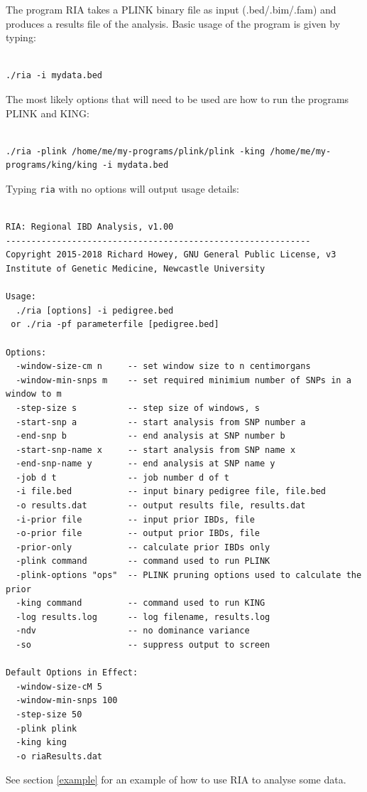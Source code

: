\documentclass[a4paper,12pt]{article}
\newcommand{\code}[1]{{\footnotesize{{\tt #1}}}}
\begin{document}
The program RIA takes a PLINK binary file as input (.bed/.bim/.fam) and produces a results file of the analysis. Basic usage of the program is given by typing: 
\vspace{0.35cm} \begin{lstlisting}

./ria -i mydata.bed

\end{lstlisting} \vspace{0.35cm}
The most likely options that will need to be used are how to run the programs PLINK and KING: 
\vspace{0.35cm} \begin{lstlisting}

./ria -plink /home/me/my-programs/plink/plink -king /home/me/my-programs/king/king -i mydata.bed

\end{lstlisting} \vspace{0.35cm}
Typing \code{ria} with no options will output usage details: 
\vspace{0.35cm} \begin{lstlisting}

RIA: Regional IBD Analysis, v1.00
------------------------------------------------------------
Copyright 2015-2018 Richard Howey, GNU General Public License, v3
Institute of Genetic Medicine, Newcastle University

Usage:
  ./ria [options] -i pedigree.bed
 or ./ria -pf parameterfile [pedigree.bed]

Options:
  -window-size-cm n     -- set window size to n centimorgans
  -window-min-snps m    -- set required minimium number of SNPs in a window to m
  -step-size s          -- step size of windows, s
  -start-snp a          -- start analysis from SNP number a
  -end-snp b            -- end analysis at SNP number b
  -start-snp-name x     -- start analysis from SNP name x
  -end-snp-name y       -- end analysis at SNP name y
  -job d t              -- job number d of t
  -i file.bed           -- input binary pedigree file, file.bed
  -o results.dat        -- output results file, results.dat
  -i-prior file         -- input prior IBDs, file
  -o-prior file         -- output prior IBDs, file
  -prior-only           -- calculate prior IBDs only
  -plink command        -- command used to run PLINK
  -plink-options "ops"  -- PLINK pruning options used to calculate the prior
  -king command         -- command used to run KING
  -log results.log      -- log filename, results.log
  -ndv                  -- no dominance variance
  -so                   -- suppress output to screen

Default Options in Effect:
  -window-size-cM 5
  -window-min-snps 100
  -step-size 50
  -plink plink
  -king king
  -o riaResults.dat

\end{lstlisting} \vspace{0.35cm}
See  section \ref{example} for an example of how to use RIA to analyse some data. 
\end{document}

